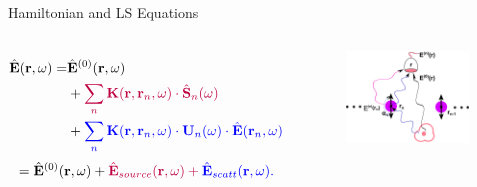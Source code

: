 \documentclass{beamer}
\begin{document}
\begin{frame}{Hamiltonian and LS Equations}
\begin{columns}
\fontsize{6.8}{-0.2}\selectfont
\begin{subequations}
\begin{align}
\hat{\mathbf{E}}(\mathbf{r},\omega) =& \hat{\mathbf{E}}^{(0)}(\mathbf{r},\omega)\nonumber \\
&+ \color{purple}{\sum_n{\mathbf{K}(\mathbf{r},\mathbf{r}_n,\omega)\cdot\hat{\mathbf{S}}_n(\omega)}}\nonumber \\
&+\color{blue}{ \sum_n{\mathbf{K}(\mathbf{r},\mathbf{r}_n,\omega)\cdot\mathbf{U}_n(\omega)\cdot\hat{\mathbf{E}}(\mathbf{r}_n,\omega)}}\nonumber
\end{align}
\end{subequations}
%
\begin{equation}
 =\hat{\mathbf{E}}^{(0)}(\mathbf{r},\omega)+ \color{purple}{\hat{\mathbf{E}}_{source}(\mathbf{r},\omega)} +\color{blue}{\hat{\mathbf{E}}_{scatt}(\mathbf{r},\omega)}. \nonumber
\end{equation}

\begin{figure}[htp]%
  \centering
 \begin{center}
 \includegraphics[width=0.98\textwidth]{./Figs/EDetection}%
 \end{center}
 \label{EDetection}
 \end{figure}


\end{columns}
\end{frame}
\end{document}
